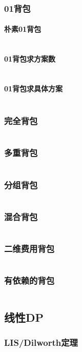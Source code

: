 \documentclass[a4paper,12pt]{article}
\begin{document}
\subsubsection{01背包}
\paragraph{朴素01背包}
\inputminted[breaklines]{c++}{dp/bag/01.cc}
\paragraph{01背包求方案数}
\inputminted[breaklines]{c++}{dp/bag/sum.cc}
\paragraph{01背包求具体方案}
\inputminted[breaklines]{c++}{dp/bag/01_way.cc}
\subsubsection{完全背包}
\inputminted[breaklines]{c++}{dp/bag/comp.cc}
\subsubsection{多重背包}
\inputminted[breaklines]{c++}{dp/bag/mul.cc}
\subsubsection{分组背包}
\inputminted[breaklines]{c++}{dp/bag/group.cc}
\subsubsection{混合背包}
\inputminted[breaklines]{c++}{dp/bag/mix.cc}
\subsubsection{二维费用背包}
\inputminted[breaklines]{c++}{dp/bag/2di.cc}
\subsubsection{有依赖的背包}
\inputminted[breaklines]{c++}{dp/bag/dep.cc}

\subsection{线性DP}
\subsubsection{LIS/Dilworth定理}
\inputminted[breaklines]{c++}{dp/linear/lis.cc}
\end{document}
